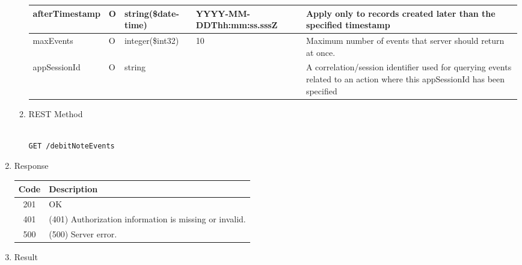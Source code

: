 \begin{enumerate}
\begin{enumerate}
\begin{table}[H]
\begin{center}
\begin{tabular}{|p{3cm}|l|p{3cm}|p{3cm}|p{4cm}|}
afterTimestamp			& O &	string(\$date-time)	&	YYYY-MM-DDThh:mm:ss.sssZ	&	Apply only to records created later than the specified timestamp \\
\hline

maxEvents				& O & 	integer(\$int32)	&	10							&	Maximum number of events that server should return at once. \\
\hline

appSessionId			& O &	string				&								&	A correlation/session identifier used for querying events related to 
																						an action where this appSessionId has been specified \\
\hline

\end{tabular}
\end{center}
\end{table}


\item REST Method

\begin{tcolorbox}[boxrule=0pt, frame empty]
\begin{verbatim} 

GET /debitNoteEvents

\end{verbatim}
\end{tcolorbox}

\end{enumerate}

\item Response

\begin{table}[H]
\footnotesize

\begin{center}
\begin{tabular}{|c|l|} 
\hline
\rowcolor{lightgray}	Code 		& 	Description \\
\hline
201	 		&	OK \\
\hline
401			&	(401) Authorization information is missing or invalid. \\
\hline
500			&	(500) Server error. \\
\hline
\end{tabular}
\end{center}

\end{table}

\item Result


\end{enumerate}
